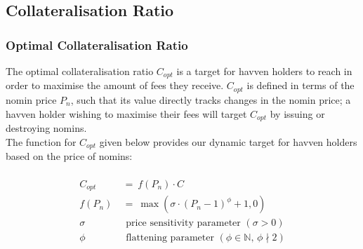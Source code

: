 \newpage
\subsection{Collateralisation Ratio}
\subsubsection{Optimal Collateralisation Ratio}

\noindent The optimal collateralisation ratio \(C_{opt}\) is a target for
havven holders to reach in order to maximise the amount of fees they receive.
\(C_{opt}\) is defined in terms of the nomin price \(P_n\), such that its value
directly tracks changes in the nomin price; a havven holder wishing to
maximise their fees will target \(C_{opt}\) by issuing or destroying nomins. \\

\noindent The function for \(C_{opt}\) given below provides our dynamic target
for havven holders based on the price of nomins:

\begin{gather} \label{eq:optcollateralisation}
\begin{align}
\begin{split}
C_{opt} \ &= \ f(P_{n}) \cdot C  \\ 
f(P_n) \ &= \ \max(\sigma \cdot {(P_n - 1)}^{\phi} + 1, 0) \\
\sigma \ & \text{ \ price sensitivity parameter } (\sigma > 0)\\
\phi   \ & \text{ \ flattening parameter } (\phi \in \mathbb{N} \text{, } \phi \nmid 2) \\
\end{split}
\end{align}
\end{gather}


\begin{center}
\end{center}

